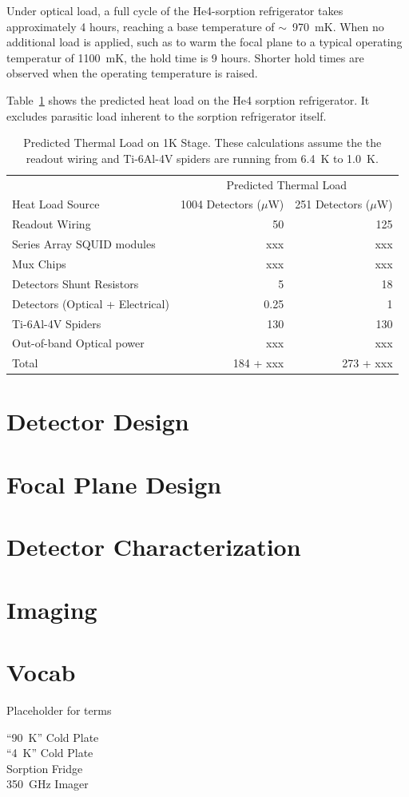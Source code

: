 \documentclass[10pt,twocolumn,article]{memoir} %
\newcommand{\tableref}[1]{Table~\ref{#1}}
\newcommand{\He}[1]{He#1\xspace}
\newcommand{\uW}{\ensuremath{\mu}W\xspace}
\begin{document}
Under optical load, a full cycle of the \He4-sorption refrigerator takes approximately 4 hours, reaching a base temperature of $\sim$~970~mK.
When no additional load is applied, such as to warm the focal plane to a typical operating temperatur of 1100~mK, the hold time is 9 hours.
Shorter hold times are observed when the operating temperature is raised. %

\tableref{tab:fp-thermal-load} shows the predicted heat load on the \He4 sorption refrigerator.
It excludes parasitic load inherent to the sorption refrigerator itself.

\begin{table}[ht]
\centering
\caption{Predicted Thermal Load on 1K Stage. These calculations assume the the readout wiring and Ti-6Al-4V spiders are running from 6.4~K to 1.0~K.}
\label{tab:fp-thermal-load}
\begin{tabular}{@{}lrr@{}}
\toprule
 & \multicolumn{2}{c}{Predicted Thermal Load} \\
\cmidrule(r){2-3}
Heat Load Source & 1004 Detectors (\uW) &  251 Detectors (\uW) \\
\midrule
Readout Wiring 								& 50 & 125 \\
Series Array SQUID modules 		& xxx & xxx \\
Mux Chips 									& xxx & xxx \\
Detectors Shunt Resistors 			& 5 & 18 \\
Detectors (Optical + Electrical)		& 0.25 & 1 \\
Ti-6Al-4V Spiders 							& 130 & 130 \\
Out-of-band Optical power 			& xxx & xxx \\
\midrule
Total												& 184 + xxx & 273 + xxx \\
\bottomrule
\end{tabular}
\end{table}


\chapter{Detector Design}\label{c:det-design}

\chapter{Focal Plane Design}\label{c:fp-design}

\chapter{Detector Characterization}\label{c:det-char}

\chapter{Imaging}\label{c:imaging}

\chapter{Vocab}

Placeholder for terms

\begin{description}
\item[``90~K'' Cold Plate]
\item[``4~K'' Cold Plate]
\item[Sorption Fridge]
\item[350~GHz Imager]

\end{description}
\end{document}
